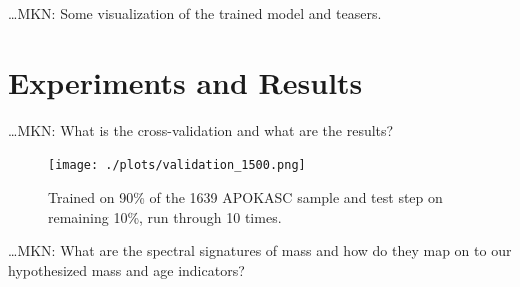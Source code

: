 \documentclass[12pt, preprint]{aastex}
\begin{document}
\ldots MKN: Some visualization of the trained model and teasers.

\section{Experiments and Results}

\ldots MKN: What is the cross-validation and what are the results?
\begin{figure}[h!]
\centering
    \texttt{[image: ./plots/validation\_1500.png]}
  \caption{Trained on 90\% of the 1639 APOKASC sample and test step on remaining 10\%, run through 10 times.}
\label{fig:validation}
\end{figure}

\ldots MKN: What are the spectral signatures of mass and how do they
map on to our hypothesized mass and age indicators?
\end{document}
